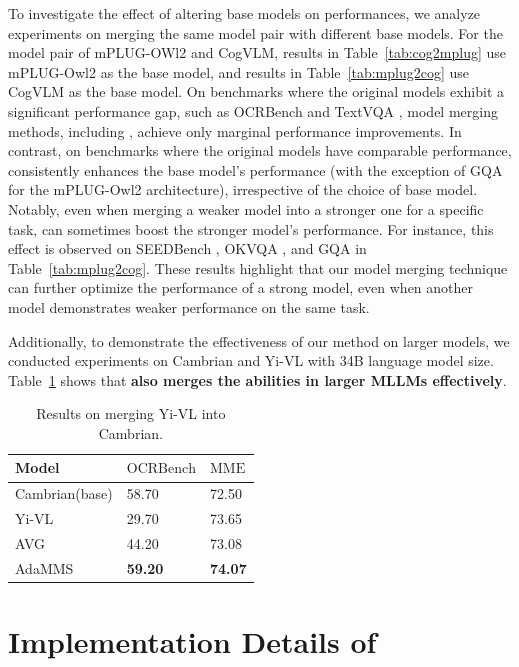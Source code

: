 To investigate the effect of altering base models on performances, we analyze experiments on merging the same model pair with different base models. For the model pair of mPLUG-OWl2 and CogVLM, results in Table~\ref{tab:cog2mplug} use mPLUG-Owl2 as the base model, and results in Table~\ref{tab:mplug2cog} use CogVLM as the base model.
On benchmarks where the original models exhibit a significant performance gap, such as OCRBench \cite{ocrbench} and TextVQA \cite{textvqa}, model merging methods, including \ours, achieve only marginal performance improvements. In contrast, on benchmarks where the original models have comparable performance, \ours consistently enhances the base model’s performance (with the exception of GQA \cite{gqa} for the mPLUG-Owl2 architecture), irrespective of the choice of base model.
Notably, even when merging a weaker model into a stronger one for a specific task, \ours can sometimes boost the stronger model's performance. For instance, this effect is observed on SEEDBench \cite{seedbench}, OKVQA \cite{okvqa}, and GQA \cite{gqa} in Table~\ref{tab:mplug2cog}. These results highlight that our model merging technique can further optimize the performance of a strong model, even when another model demonstrates weaker performance on the same task.

Additionally, to demonstrate the effectiveness of our method on larger models, we conducted experiments on Cambrian and Yi-VL with 34B language model size. Table~\ref{tab:larger} shows that \textbf{\ours also merges the abilities in larger MLLMs effectively}.

\begin{table}[!ht]
    \centering\small
    \begin{tabular}{lll}
    \hline
        Model & $\mathrm{OCRBench}$ & $\mathrm{MME}$  \\ \hline
        Cambrian\footnotesize(base) & 58.70 & 72.50 \\ 
        Yi-VL & 29.70 & 73.65\\ 
        AVG & 44.20 & 73.08  \\        
        AdaMMS & \textbf{59.20} & \textbf{74.07}  \\ \hline
    \end{tabular}
    \caption{Results on merging Yi-VL into Cambrian.}
    \label{tab:larger}
\end{table}


\section{Implementation Details of \ours}
\label{appendix:impl}

